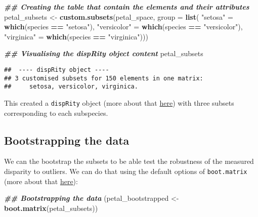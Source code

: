 \documentclass[
]{book}
\newenvironment{Shaded}{\begin{snugshade}}{\end{snugshade}}
\newcommand{\AttributeTok}[1]{\textcolor[rgb]{0.13,0.29,0.53}{#1}}
\newcommand{\DocumentationTok}[1]{\textcolor[rgb]{0.56,0.35,0.01}{\textbf{\textit{#1}}}}
\newcommand{\FunctionTok}[1]{\textcolor[rgb]{0.13,0.29,0.53}{\textbf{#1}}}
\newcommand{\NormalTok}[1]{#1}
\newcommand{\OtherTok}[1]{\textcolor[rgb]{0.56,0.35,0.01}{#1}}
\newcommand{\SpecialCharTok}[1]{\textcolor[rgb]{0.81,0.36,0.00}{\textbf{#1}}}
\newcommand{\StringTok}[1]{\textcolor[rgb]{0.31,0.60,0.02}{#1}}
\begin{document}
\begin{Shaded}
\begin{Highlighting}[]
\DocumentationTok{\#\# Creating the table that contain the elements and their attributes}
\NormalTok{petal\_subsets }\OtherTok{\textless{}{-}} \FunctionTok{custom.subsets}\NormalTok{(petal\_space, }\AttributeTok{group =} \FunctionTok{list}\NormalTok{(}
                                \StringTok{"setosa"} \OtherTok{=} \FunctionTok{which}\NormalTok{(species }\SpecialCharTok{==} \StringTok{"setosa"}\NormalTok{),}
                                \StringTok{"versicolor"} \OtherTok{=} \FunctionTok{which}\NormalTok{(species }\SpecialCharTok{==} \StringTok{"versicolor"}\NormalTok{),}
                                \StringTok{"virginica"} \OtherTok{=} \FunctionTok{which}\NormalTok{(species }\SpecialCharTok{==} \StringTok{"virginica"}\NormalTok{)))}

\DocumentationTok{\#\# Visualising the dispRity object content}
\NormalTok{petal\_subsets}
\end{Highlighting}
\end{Shaded}

\begin{verbatim}
##  ---- dispRity object ---- 
## 3 customised subsets for 150 elements in one matrix:
##     setosa, versicolor, virginica.
\end{verbatim}

This created a \texttt{dispRity} object (more about that \protect\hyperlink{guts}{here}) with three subsets corresponding to each subspecies.

\hypertarget{bootstrapping-the-data}{%
\subsection{Bootstrapping the data}\label{bootstrapping-the-data}}

We can the bootstrap the subsets to be able test the robustness of the measured disparity to outliers.
We can do that using the default options of \texttt{boot.matrix} (more about that \protect\hyperlink{bootstraps-and-rarefactions}{here}):

\begin{Shaded}
\begin{Highlighting}[]
\DocumentationTok{\#\# Bootstrapping the data}
\NormalTok{(petal\_bootstrapped }\OtherTok{\textless{}{-}} \FunctionTok{boot.matrix}\NormalTok{(petal\_subsets))}
\end{Highlighting}
\end{Shaded}
\end{document}
